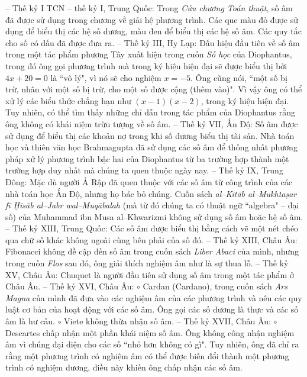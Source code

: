 \begin{multicols}{2}
	\vskip 0.1cm
	-- Thế kỷ I TCN -- thế kỷ I, Trung Quốc: Trong \textit{Cửu chương Toán thuật}, số âm đã được sử dụng trong chương về giải hệ phương trình. Các que màu đỏ được sử dụng để biểu thị các hệ số dương, màu đen để biểu thị các hệ số âm. Các quy tắc cho số có dấu đã được đưa ra.
	\vskip 0.1cm
	-- Thế kỷ III, Hy Lạp: Dấu hiệu đầu tiên về số âm trong một tác phẩm phương Tây xuất hiện trong cuốn \textit{Số học} của Diophantus, trong đó ông gọi phương trình mà trong ký hiệu hiện đại sẽ được biểu thị bởi $4x + 20 = 0$ là ``vô lý", vì nó sẽ cho nghiệm $x=-5$. Ông cũng nói, ``một số bị trừ, nhân với một số bị trừ, cho một số được cộng (thêm vào)". Vì vậy ông có thể xử lý các biểu thức chẳng hạn như $(x-1)(x-2)$, trong ký hiệu hiện đại. Tuy nhiên, có thể tìm thấy những chỉ dẫn trong tác phẩm của Diophantus rằng ông không có khái niệm trừu tượng về số âm.
	\vskip 0.1cm
	-- Thế kỷ VII, Ấn Độ: Số âm được sử dụng để biểu thị các khoản nợ trong khi số dương biểu thị tài sản. Nhà toán học và thiên văn học Brahmagupta đã sử dụng các số âm để thống nhất phương pháp xử lý phương trình bậc hai của Diophantus từ ba trường hợp thành một trường hợp duy nhất mà chúng ta quen thuộc ngày nay.
	\vskip 0.1cm
	-- Thế kỷ IX, Trung Đông: Mặc dù người Ả Rập đã quen thuộc với các số âm từ công trình của các nhà toán học Ấn Độ, nhưng họ bác bỏ chúng. Cuốn sách \textit{al--Kitāb al--Mukhtaṣar fī Ḥisāb al--Jabr wal--Muqābalah} (mà từ đó chúng ta có thuật ngữ ``algebra" -- đại số) của Muhammad ibn Musa al--Khwarizmi không sử dụng số âm hoặc hệ số âm.
	\vskip 0.1cm
	-- Thế kỷ XIII, Trung Quốc: Các số âm được biểu thị bằng cách vẽ một nét chéo qua chữ số khác không ngoài cùng bên phải của số đó.
	\vskip 0.1cm
	-- Thế kỷ XIII, Châu Âu: Fibonacci không đề cập đến số âm trong cuốn sách \textit{Liber Abaci} của mình, nhưng trong cuốn \textit{Flos} sau đó, ông giải thích nghiệm âm như là sự thua lỗ.
	\vskip 0.1cm
	-- Thế kỷ XV, Châu Âu: Chuquet là người đầu tiên sử dụng số âm trong một tác phẩm ở Châu Âu.
	\vskip 0.1cm
	-- Thế kỷ XVI, Châu Âu: 
	\vskip 0.1cm
	$\circ$ Cardan (Cardano), trong cuốn sách \textit{Ars Magna} của mình đã đưa vào các nghiệm âm của các phương trình và nêu các quy luật cơ bản của hoạt động với các số âm. Ông gọi các số dương là thực và các số âm là hư cấu.
	\vskip 0.1cm
	$\circ$ Viete không thừa nhận số âm.
	\vskip 0.1cm
	-- Thế kỷ XVII, Châu Âu:
	\vskip 0.1cm
	$\circ$ Descartes chấp nhận một phần khái niệm số âm. Ông không công nhận nghiệm âm vì chúng đại diện cho các số ``nhỏ hơn không có gì". Tuy nhiên, ông đã chỉ ra rằng một phương trình có nghiệm âm có thể được biến đổi thành một phương trình có nghiệm dương, điều này khiến ông chấp nhận các số âm.

\end{multicols}
